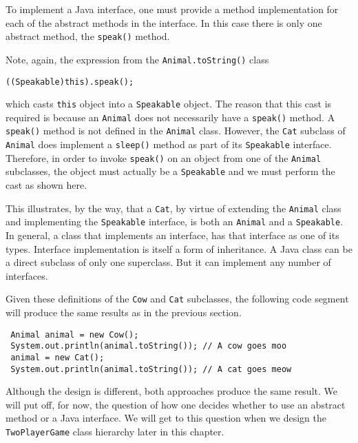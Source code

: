 \noindent To implement a Java interface, one must provide a method
implementation for each of the abstract methods in the interface. In
this case there is only one abstract method, the {\tt speak()} method.

Note, again, the expression from the {\tt Animal.toString()} class 

\begin{jjjlisting}
\begin{lstlisting}
((Speakable)this).speak();
\end{lstlisting}
\end{jjjlisting}

\noindent which casts {\tt this} object into a {\tt Speakable} object. 
The reason that this cast is required is because an {\tt Animal} does
not necessarily have a {\tt speak()} method. A {\tt speak()} method is
not defined in the {\tt Animal} class. However, the {\tt Cat} subclass
of {\tt Animal} does implement a {\tt sleep()} method as part of its
{\tt Speakable} interface.  Therefore, in order to invoke {\tt speak()}
on an object from one of the {\tt Animal} subclasses, the object must
actually be a {\tt Speakable} and we must perform the cast as shown here.

This illustrates, by the way, that a {\tt Cat}, by virtue of extending
the {\tt Animal} class and implementing the {\tt Speakable} interface,
is both an {\tt Animal} and a {\tt Speakable}.  In general, a class
that implements an interface, has that interface as one of its types.
Interface implementation is itself a form of inheritance. A Java class
can be a direct subclass of only one superclass. But it can implement
any number of interfaces. 

Given these definitions of the {\tt Cow} and {\tt Cat} subclasses, the
following code segment will produce the same results as in the previous
section.

\begin{jjjlisting}
\begin{lstlisting}
 Animal animal = new Cow();
 System.out.println(animal.toString()); // A cow goes moo
 animal = new Cat();
 System.out.println(animal.toString()); // A cat goes meow
\end{lstlisting}
\end{jjjlisting}

\noindent Although the design is different, both approaches produce the
same result. We will put off, for now, the question of how one decides
whether to use an abstract method or a Java interface. We will get to this
question when we design the {\tt TwoPlayerGame} class hierarchy later in
this chapter.


